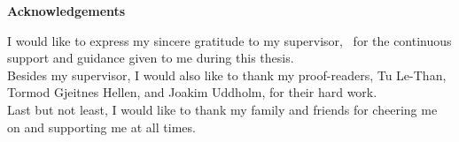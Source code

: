 \noindent \textbf{Acknowledgements}
\thispagestyle{empty}
\vspace*{1cm}

\noindent
I would like to express my sincere gratitude to my supervisor, \firstsupervisor \, for the continuous support and guidance given to me during this thesis.\\

\medskip\noindent
Besides my supervisor, I would also like to thank my proof-readers, Tu Le-Than, Tormod Gjeitnes Hellen, and Joakim Uddholm, for their hard work.\\

\medskip\noindent
Last but not least, I would like to thank my family and friends for cheering me on and supporting me at all times.

\addtocounter{page}{-1}
